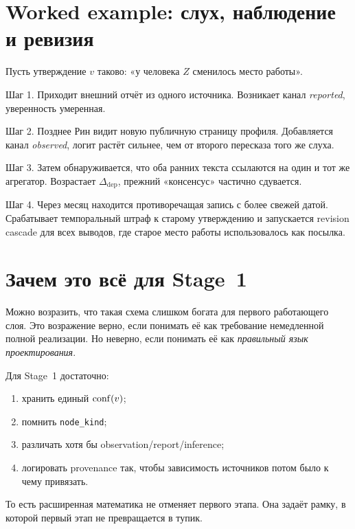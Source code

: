\section{Worked example: слух, наблюдение и ревизия}

\begin{workedbox}
Пусть утверждение $v$ таково: «у человека $Z$ сменилось место работы».

Шаг 1. Приходит внешний отчёт из одного источника. Возникает канал \emph{reported},
уверенность умеренная.

Шаг 2. Позднее Рин видит новую публичную страницу профиля. Добавляется канал
\emph{observed}, логит растёт сильнее, чем от второго пересказа того же слуха.

Шаг 3. Затем обнаруживается, что оба ранних текста ссылаются на один и тот же
агрегатор. Возрастает $\Delta_{\mathrm{dep}}$, прежний «консенсус» частично сдувается.

Шаг 4. Через месяц находится противоречащая запись с более свежей датой. Срабатывает
темпоральный штраф к старому утверждению и запускается revision cascade для всех
выводов, где старое место работы использовалось как посылка.
\end{workedbox}

\section{Зачем это всё для Stage~1}

Можно возразить, что такая схема слишком богата для первого работающего слоя. Это
возражение верно, если понимать её как требование немедленной полной реализации.
Но неверно, если понимать её как \emph{правильный язык проектирования}.

Для Stage~1 достаточно:
\begin{enumerate}
\item хранить единый $\mathrm{conf}(v)$;
\item помнить \texttt{node\_kind};
\item различать хотя бы observation/report/inference;
\item логировать provenance так, чтобы зависимость источников потом было к чему привязать.
\end{enumerate}

То есть расширенная математика не отменяет первого этапа. Она задаёт рамку, в
которой первый этап не превращается в тупик.
